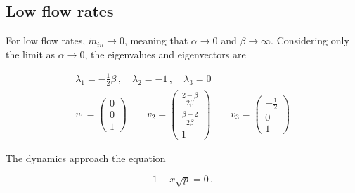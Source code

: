 

\newpage
\subsection{Low flow rates}

For low flow rates, $\dot{m}_{in} \rightarrow 0$, meaning that $\alpha \rightarrow 0$ and $\beta \rightarrow \infty$. Considering only the limit as $\alpha \rightarrow 0$, the eigenvalues and eigenvectors are

\begin{equation*}
\begin{split}
    \lambda_1 = - \frac{1}{2}\beta \, , \quad
    \lambda_2 = -1 \, , \quad
    \lambda_3 = 0 \\
    v_1 = \begin{pmatrix}
    0 \\ 0 \\ 1
    \end{pmatrix} \qquad
    v_2 = \begin{pmatrix}
    \frac{2 - \beta}{2\beta} \\ \frac{\beta - 2}{2\beta} \\ 1
    \end{pmatrix} \qquad
    v_3 = \begin{pmatrix}
    - \frac{1}{2} \\ 0 \\ 1
    \end{pmatrix}
\end{split}
\end{equation*}

The dynamics approach the equation

\begin{equation*}
    1 - x \sqrt{p} = 0 \, .
\end{equation*}

